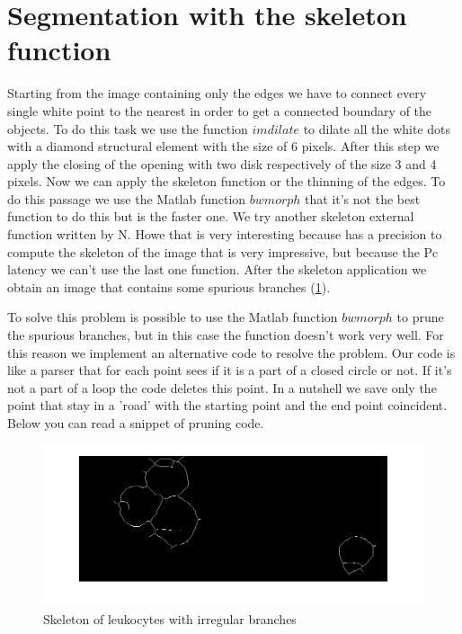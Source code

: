 \section{Segmentation with the skeleton function}
Starting from the image containing only the edges we have to connect every single white point to the nearest in order to get a connected boundary of the objects. To do this task we use the function $imdilate$ to dilate all the white dots with a diamond structural element with the size of 6 pixels. After this step we apply the closing of the opening with two disk respectively of the size 3 and 4 pixels. Now we can apply the skeleton function or the thinning of the edges. To do this passage we use the Matlab function $bwmorph$ that it's not the best function to do this but is the faster one. We try another skeleton external function written by N. Howe that is very interesting because has a precision to compute the skeleton of the image that is very impressive, but because the Pc latency we can't use the last one function. After the skeleton application we obtain an image that contains some spurious branches (\ref{fig:skel}). 

\bigskip

To solve this problem is possible to use the Matlab function $bwmorph$ to prune the spurious branches, but in this case the function doesn’t work very well. For this reason we implement an alternative code to resolve the problem. Our code is like a parser that for each point sees if it is a part of a closed circle or not. If it's not a part of a loop the code deletes this point. In a nutshell we save only the point that stay in a 'road' with the starting point and the end point coincident. Below you can read a snippet of pruning code.
\begin{figure}
	\begin{center}
		\centering
		\includegraphics[scale=0.5]{img/skel.png}
		\caption{Skeleton of leukocytes with irregular branches}
		\label{fig:skel}
	\end{center}
\end{figure}

